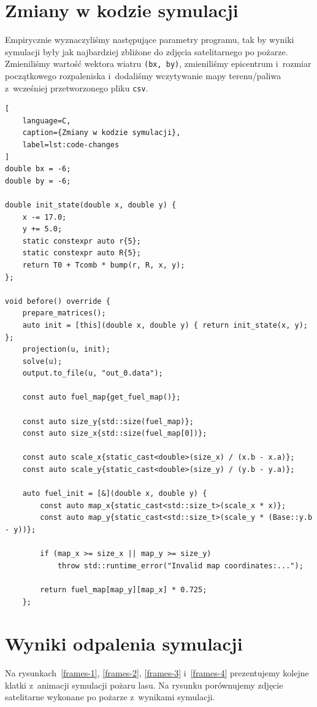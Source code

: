 \documentclass{article}
\begin{document}
\section{Zmiany w kodzie symulacji}
Empirycznie wyznaczyliśmy następujące parametry programu, tak by wyniki symulacji były jak najbardziej zbliżone do zdjęcia satelitarnego po pożarze.
Zmieniliśmy wartość wektora wiatru \texttt{(bx, by)}, zmieniliśmy epicentrum i~rozmiar początkowego rozpaleniska i~dodaliśmy wczytywanie mapy terenu/paliwa z~wcześniej przetworzonego pliku \texttt{csv}.

\begin{lstlisting}[
    language=C,
    caption={Zmiany w kodzie symulacji},
    label=lst:code-changes
]
double bx = -6;
double by = -6;

double init_state(double x, double y) {
    x -= 17.0;
    y += 5.0;
    static constexpr auto r{5};
    static constexpr auto R{5};
    return T0 + Tcomb * bump(r, R, x, y);
};

void before() override {
    prepare_matrices();
    auto init = [this](double x, double y) { return init_state(x, y); };
    projection(u, init);
    solve(u);
    output.to_file(u, "out_0.data");

    const auto fuel_map{get_fuel_map()};

    const auto size_y{std::size(fuel_map)};
    const auto size_x{std::size(fuel_map[0])};

    const auto scale_x{static_cast<double>(size_x) / (x.b - x.a)};
    const auto scale_y{static_cast<double>(size_y) / (y.b - y.a)};

    auto fuel_init = [&](double x, double y) {
        const auto map_x{static_cast<std::size_t>(scale_x * x)};
        const auto map_y{static_cast<std::size_t>(scale_y * (Base::y.b - y))};

        if (map_x >= size_x || map_y >= size_y)
            throw std::runtime_error("Invalid map coordinates:...");

        return fuel_map[map_y][map_x] * 0.725;
    };
\end{lstlisting}

\section{Wyniki odpalenia symulacji}
\label{chap:results}

    Na rysunkach~\ref{frames-1}, \ref{frames-2}, \ref{frames-3} i~\ref{frames-4} prezentujemy kolejne klatki z~animacji symulacji pożaru lasu.
    Na rysunku porównujemy zdjęcie satelitarne wykonane po pożarze z~wynikami symulacji.
\end{document}
